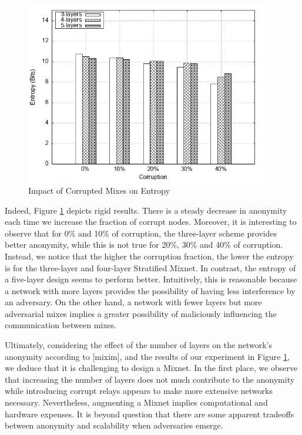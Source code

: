 \documentclass[logo,msc,cyber]{infthesis}   %
\begin{document}
\begin{figure}[h!]
    \centering
    \includegraphics[height=8cm]{figures/mixim/4.png}
    \caption{Impact of Corrupted Mixes on Entropy}
    \label{fig:corrupted-mixes}
 \end{figure}

Indeed, Figure \ref{fig:corrupted-mixes} depicts rigid results. There is a
steady decrease in anonymity each time we increase the fraction of corrupt
nodes. Moreover, it is interesting to observe that for 0\% and 10\% of
corruption, the three-layer scheme provides better anonymity, while this is not
true for 20\%, 30\% and 40\% of corruption. Instead, we notice that the higher
the corruption fraction, the lower the entropy is for the three-layer and
four-layer Stratified Mixnet. In contrast, the entropy of a five-layer design
seems to perform better. Intuitively, this is reasonable because a network with
more layers provides the possibility of having less interference by an
adversary. On the other hand, a network with fewer layers but more adversarial
mixes implies a greater possibility of maliciously influencing the communication
between mixes.

Ultimately, considering the effect of the number of layers on the network's
anonymity according to [mixim], and the results of our experiment in Figure
\ref{fig:corrupted-mixes}, we deduce that it is challenging to design a Mixnet.
In the first place, we observe that increasing the number of layers does not
much contribute to the anonymity while introducing corrupt relays appears to
make more extensive networks necessary. Nevertheless, augmenting a Mixnet
implies computational and hardware expenses. It is beyond question that there
are some apparent tradeoffs between anonymity and scalability when adversaries
emerge.
\end{document}
